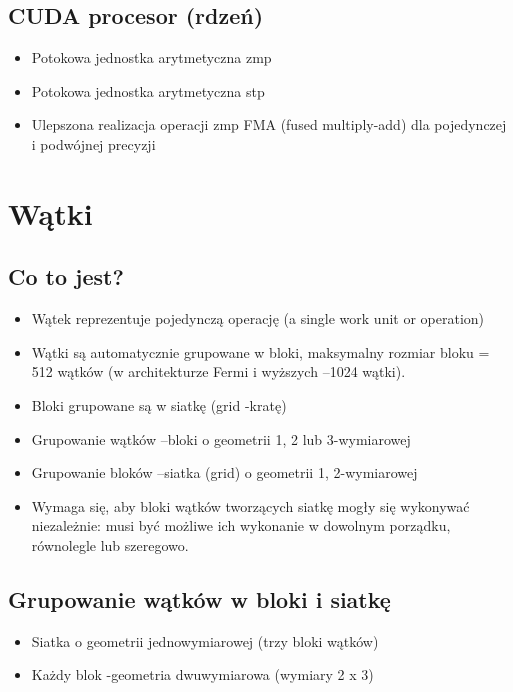 	\subsection{CUDA procesor (rdzeń)}
		\begin{itemize}
			\item Potokowa jednostka arytmetyczna zmp
			\item Potokowa jednostka arytmetyczna stp
			\item Ulepszona realizacja operacji zmp FMA (fused multiply-add) dla pojedynczej i podwójnej precyzji
		\end{itemize}

	\section{Wątki}
		\subsection{Co to jest?}
			\begin{itemize}
				\item Wątek reprezentuje pojedynczą operację (a single work unit or operation)
				\item Wątki są automatycznie grupowane w bloki, maksymalny rozmiar bloku = 512 wątków (w architekturze Fermi i wyższych –1024 wątki).
				\item Bloki grupowane są w siatkę (grid -kratę)
				\item Grupowanie wątków –bloki o geometrii 1, 2 lub 3-wymiarowej
				\item Grupowanie bloków –siatka (grid) o geometrii 1, 2-wymiarowej
				\item Wymaga się, aby bloki wątków tworzących siatkę mogły się wykonywać niezależnie: musi być możliwe ich wykonanie w dowolnym porządku, równolegle lub szeregowo.
			\end{itemize}
		\subsection{Grupowanie wątków w bloki i siatkę}
			\begin{itemize}
				\item Siatka o geometrii jednowymiarowej (trzy bloki wątków)
				\item Każdy blok -geometria dwuwymiarowa (wymiary 2 x 3)
			\end{itemize}
